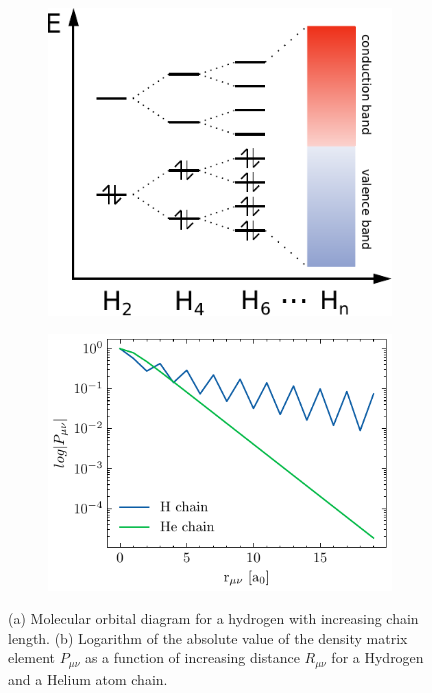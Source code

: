 \begin{figure}
\centering
\begin{subfigure}{0.45\linewidth}
\centering
\includegraphics[scale=0.8]{Pics/MOchain}
\caption{}
\end{subfigure}
\begin{subfigure}{0.45\linewidth}
\centering
\includegraphics[scale=0.8]{Pics/density_decay}
\caption{}
\end{subfigure}
\caption[MO diagram and decay of density matrix elements in the infinite hydrogen chain]{(a) Molecular orbital diagram for a hydrogen with increasing chain length. (b) Logarithm of the absolute value of the density matrix element $P_{\mu\nu}$ as a function of increasing distance $R_{\mu\nu}$ for a Hydrogen and a Helium atom chain.}
\label{fig:HCHAIN_DENSITY}
\end{figure}



